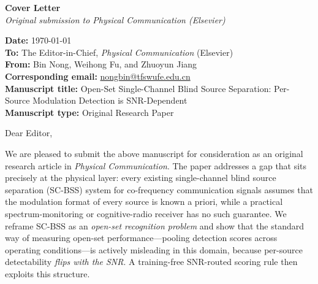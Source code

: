 \documentclass[11pt,a4paper]{article}
\begin{document}
\begin{center}
{\Large\bfseries Cover Letter}\\[4pt]
{\itshape Original submission to \emph{Physical Communication} (Elsevier)}
\end{center}

\vspace{1em}

\noindent\textbf{Date:} \today\\[2pt]
\textbf{To:} The Editor-in-Chief, \emph{Physical Communication} (Elsevier)\\
\textbf{From:} Bin Nong, Weihong Fu, and Zhuoyun Jiang\\
\textbf{Corresponding email:} \href{mailto:nongbin@tfswufe.edu.cn}{nongbin@tfswufe.edu.cn}\\
\textbf{Manuscript title:} Open-Set Single-Channel Blind Source Separation: Per-Source Modulation Detection is SNR-Dependent\\
\textbf{Manuscript type:} Original Research Paper

\vspace{1em}

\noindent Dear Editor,

\vspace{0.4em}

We are pleased to submit the above manuscript for consideration as an original research article in \emph{Physical Communication}. The paper addresses a gap that sits precisely at the physical layer: every existing single-channel blind source separation (SC-BSS) system for co-frequency communication signals assumes that the modulation format of every source is known a priori, while a practical spectrum-monitoring or cognitive-radio receiver has no such guarantee. We reframe SC-BSS as an \emph{open-set recognition problem} and show that the standard way of measuring open-set performance---pooling detection scores across operating conditions---is actively misleading in this domain, because per-source detectability \emph{flips with the SNR}. A training-free SNR-routed scoring rule then exploits this structure.
\end{document}
